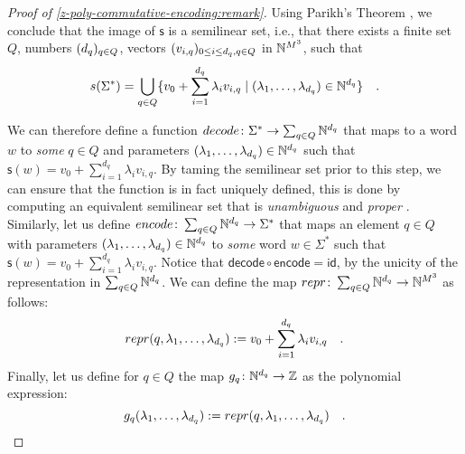 \begin{proof}[Proof of \cref{z-poly-commutative-encoding:remark}]
    Using Parikh's Theorem \cite{parikh66context},
    we conclude that the image of $\mathsf{s}$ is a semilinear set,
    i.e., that there exists a finite set $Q$,
    numbers $(d_q)_{q \in Q}$,
    vectors $(v_{i,q})_{0 \leq i \leq d_q, q \in Q}$ in $\mathbb{N}^{M^3}$,
    such that
    \begin{equation*}
        \mathsf{s}(\Sigma^*) =
        \bigcup_{q \in Q}
        \setof{
            v_0 + \sum_{i = 1}^{d_q} \lambda_i v_{i,q}
        }{
            (\lambda_1, \dots, \lambda_{d_q}) \in \Nat^{d_q}
        } \quad .
    \end{equation*}

    We can therefore define a function $\mathsf{decode} \colon \Sigma^* \to
    \sum_{q \in Q} \Nat^{d_q}$ that maps to a word $w$ to \emph{some} $q \in Q$
    and parameters $(\lambda_1, \dots, \lambda_{d_q}) \in \mathbb{N}^{d_q}$ such that
    $\mathsf{s}(w) = v_0 + \sum_{i = 1}^{d_q} \lambda_i v_{i,q}$. By taming the
    semilinear set prior to this step, we can ensure that the function is in
    fact uniquely defined, this is done by computing an equivalent semilinear
    set that is \emph{unambiguous} and \emph{proper} \cite{chistikov16}.
    Similarly, let us define $\mathsf{encode} \colon \sum_{q \in Q} \Nat^{d_q}
    \to \Sigma^*$ that maps an element $q \in Q$ with parameters $(\lambda_1,
    \dots, \lambda_{d_q}) \in \mathbb{N}^{d_q}$ to \emph{some} word $w \in \Sigma^*$
    such that $\mathsf{s}(w) = v_0 + \sum_{i = 1}^{d_q} \lambda_i v_{i,q}$.
    Notice that $\mathsf{decode} \circ \mathsf{encode} = \mathsf{id}$, by the
    unicity of the representation in $\sum_{q \in Q} \mathbb{N}^{d_q}$.
    We can define the map $\mathsf{repr} \colon \sum_{q \in Q} \Nat^{d_q} \to \Nat^{M^3}$
    as follows:
    \begin{equation*}
        \mathsf{repr}(q, \lambda_1, \dots, \lambda_{d_q}) \defined
        v_0 + \sum_{i = 1}^{d_q} \lambda_i v_{i,q}
        \quad .
    \end{equation*}
    Finally, let us define for $q \in Q$ the map $g_q \colon \mathbb{N}^{d_q} \to \mathbb{Z}$ as the polynomial
    expression:
    \begin{equation*}
        g_q(\lambda_1, \dots, \lambda_{d_q}) \defined \mathsf{repr}(q, \lambda_1, \dots, \lambda_{d_q}) \quad .
    \end{equation*}


\end{proof}
